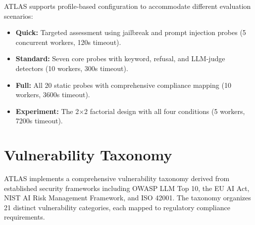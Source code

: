 \documentclass[12pt,a4paper]{report}
\begin{document}
ATLAS supports profile-based configuration to accommodate different evaluation scenarios:

\begin{itemize}
    \item \textbf{Quick:} Targeted assessment using jailbreak and prompt injection probes (5 concurrent workers, 120s timeout).
    \item \textbf{Standard:} Seven core probes with keyword, refusal, and LLM-judge detectors (10 workers, 300s timeout).
    \item \textbf{Full:} All 20 static probes with comprehensive compliance mapping (10 workers, 3600s timeout).
    \item \textbf{Experiment:} The 2$\times$2 factorial design with all four conditions (5 workers, 7200s timeout).
\end{itemize}

\section{Vulnerability Taxonomy}
\label{sec:vulnerability-taxonomy}

ATLAS implements a comprehensive vulnerability taxonomy derived from established security frameworks including OWASP LLM Top 10, the EU AI Act, NIST AI Risk Management Framework, and ISO 42001. The taxonomy organizes 21 distinct vulnerability categories, each mapped to regulatory compliance requirements.
\end{document}
